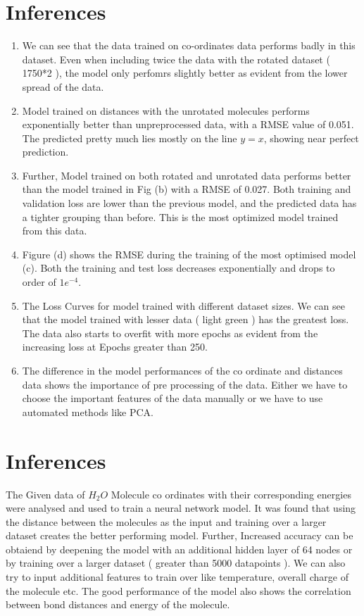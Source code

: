 \documentclass{article}
\begin{document}
\section{Inferences}
\begin{flushleft}
    \begin{enumerate}
        \item We can see that the data trained on co-ordinates data performs badly in this dataset. Even when including twice the data with the rotated dataset ( 1750*2 ), the model only perfomrs slightly better as evident from the lower spread of the data.
        \item Model trained on distances with the unrotated molecules performs exponentially better than unpreprocessed data, with a RMSE value of 0.051. The predicted pretty much lies mostly on the line $y=x$, showing near perfect prediction.
        \item Further, Model trained on both rotated and unrotated data performs better than the model trained in Fig (b) with a RMSE of 0.027. Both training and validation loss are lower than the previous model, and the predicted data has a tighter grouping than before. This is the most optimized model trained from this data.
        \item Figure (d) shows the RMSE during the training of the most optimised model (c). Both the training and test loss decreases exponentially and drops to order of $1e^{-4}$.
        \item The Loss Curves for model trained with different dataset sizes. We can see that the model trained with lesser data ( light green ) has the greatest loss. The data also starts to overfit with more epochs as evident from the increasing loss at Epochs greater than 250.
        \item The difference in the model performances of the co ordinate and distances data shows the importance of pre processing of the data. Either we have to choose the important features of the data manually or we have to use automated methods like PCA.
    \end{enumerate}
\end{flushleft}

\section{Inferences}
\begin{flushleft}
    The Given data of $H_2O$ Molecule co ordinates with their corresponding energies were analysed and used to train a neural network model. It was found that using the distance between the molecules as the input and training over a larger dataset creates the better performing model. Further, Increased accuracy can be obtaiend by deepening the model with an additional hidden layer of 64 nodes or by training over a larger dataset ( greater than 5000 datapoints ). We can also try to input additional features to train over like temperature, overall charge of the molecule etc. The good performance of the model also shows the correlation between bond distances and energy of the molecule.
\end{flushleft}
\end{document}
